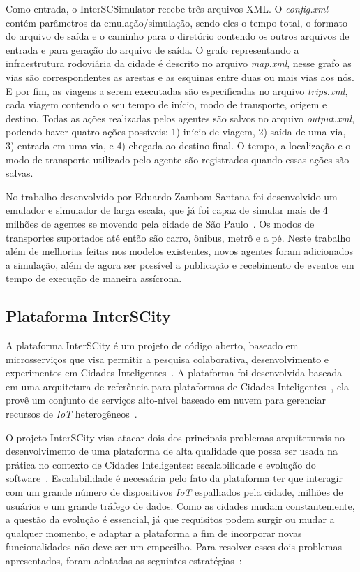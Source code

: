 Como entrada, o InterSCSimulator recebe três arquivos XML. O \textit{config.xml} contém parâmetros da emulação/simulação, sendo eles o tempo total, o formato do
arquivo de saída e o caminho para o diretório contendo os outros arquivos de entrada e para geração do arquivo de saída.
O grafo representando a infraestrutura rodoviária da cidade é descrito no arquivo \textit{map.xml}, nesse grafo as vias são correspondentes as arestas e as esquinas entre
duas ou mais vias aos nós.
E por fim, as viagens a serem executadas são especificadas no arquivo \textit{trips.xml}, cada viagem contendo o seu tempo de início, modo de transporte, origem e destino.
Todas as ações realizadas pelos agentes são salvos no arquivo \textit{output.xml}, podendo haver quatro ações possíveis: 1) início de viagem, 2) saída de uma via,
3) entrada em uma via, e 4) chegada ao destino final.
O tempo, a localização e o modo de transporte utilizado pelo agente são registrados quando essas ações são salvas.

No trabalho desenvolvido por Eduardo Zambom Santana foi desenvolvido um emulador e simulador de larga escala, que já foi capaz de simular mais de 4 milhões de
agentes se movendo pela cidade de São Paulo~\cite{santana_17}.
Os modos de transportes suportados até então são carro, ônibus, metrô e a pé.
Neste trabalho além de melhorias feitas nos modelos existentes, novos agentes foram adicionados a simulação, além de agora ser possível a publicação e recebimento de
eventos em tempo de execução de maneira assícrona.

\subsection{Plataforma InterSCity}

A plataforma InterSCity é um projeto de código aberto, baseado em microsserviços que visa permitir a pesquisa colaborativa, desenvolvimento e experimentos em Cidades
Inteligentes~\cite{arthur_17}.
A plataforma foi desenvolvida baseada em uma arquitetura de referência para plataformas de Cidades Inteligentes~\cite{santana_2016}, ela provê um conjunto de serviços
alto-nível baseado em nuvem para gerenciar recursos de \textit{IoT} heterogêneos~\cite{arthur_17}.

O projeto InterSCity visa atacar dois dos principais problemas arquiteturais no desenvolvimento de uma plataforma de alta qualidade que possa ser usada na prática no
contexto de Cidades Inteligentes: escalabilidade e evolução do software~\cite{arthur_17}.
Escalabilidade é necessária pelo fato da plataforma ter que interagir com um grande número de dispositivos \textit{IoT} espalhados pela cidade, milhões de usuários e
um grande tráfego de dados.
Como as cidades mudam constantemente, a questão da evolução é essencial, já que requisitos podem surgir ou mudar a qualquer momento, e adaptar a plataforma a fim de
incorporar novas funcionalidades não deve ser um empecilho.
Para resolver esses dois problemas apresentados, foram adotadas as seguintes estratégias~\cite{arthur_17}:

